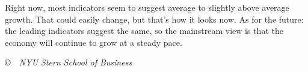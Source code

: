 \documentclass[12pt]{exam}
\begin{document}
\begin{questions}
\begin{solution}
\begin{parts}
\item Right now, most indicators seem to suggest average to slightly above average 
growth.  
That could easily change, but that's how it looks now.
As for the future:  
the leading indicators suggest the same, so the mainstream view is that 
the economy will continue to grow at a steady pace.

\end{parts}
\end{solution}

\end{questions}

\vfill \centerline{\it \copyright \ \number\year \
NYU Stern School of Business}
\end{document}
